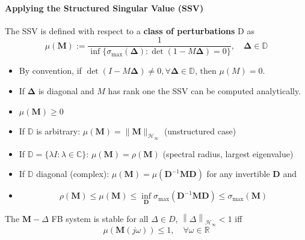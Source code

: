 \paragraph{Applying the Structured Singular Value (SSV)}


The SSV is defined with respect to a \textbf{class of perturbations} $\mathrm{D}$ as
\begin{equation*}
    \mu(\mathbf{M}):=\frac1{\inf\{\sigma_{\max}(\boldsymbol{\Delta}):\det(1-M\boldsymbol{\Delta})=0\}},\quad\boldsymbol{\Delta}\in\mathbb{D}
\end{equation*}
\begin{itemize}
    \item By convention, if $\det(I-M\boldsymbol{\Delta})\neq0,\forall\boldsymbol{\Delta}\in\mathbb{D}\text{, then }\mu(M)=0$.
    \item If $\boldsymbol{\Delta}$ is diagonal and $M$ has rank one the SSV can be computed analytically.
\end{itemize}

\begin{itemize}
    \item $\mu(\mathbf{M})\geq0$
    \item If $\mathbb{D}$ is arbitrary: $\mu(\mathbf{M})=\|\mathbf{M}\|_{\mathcal{H}_\infty}$ (unstructured case)
    \item If $\mathbb{D}=\{\lambda I:\lambda\in\mathbb{C}\}$: $\mu(\mathbf{M})=\rho(\mathbf{M})$ (spectral radius, largest eigenvalue)
    \item If $\mathbb{D}$ diagonal (complex): $\mu(\mathbf{M})=\mu(\mathbf{D}^{-1}\mathbf{MD})$ for any invertible $\mathbf{D}$ and
    \item \begin{equation*}
              \rho(\mathbf{M})\leq\mu(\mathbf{M})\leq\inf_{\mathbf{D}}\sigma_{\max}(\mathbf{D}^{-1}\mathbf{MD})\leq\sigma_{\max}(\mathbf{M})
          \end{equation*}
\end{itemize}



The $\mathbf{M}-\Delta$ FB system is stable for all $\Delta\in D$, $\left\|\Delta\right\|_{\mathcal{H}_\infty}<1$ iff
\begin{equation*}
    \mu(\mathbf{M}(j\omega))\leq1,\quad\forall\omega\in\mathbb{R}
\end{equation*}

